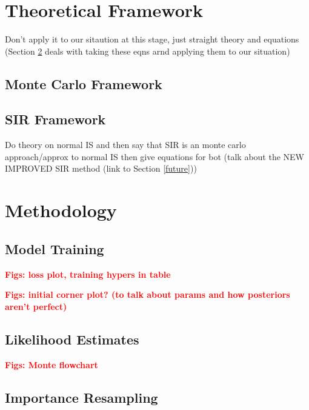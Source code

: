 \documentclass[prd,superscriptaddress,twocolumn,nopreprintnumbers,floatfix]{revtex4}
\begin{document}
\section{Theoretical Framework}\label{theory}

Don't apply it to our sitaution at this stage, just straight theory and equations (Section \ref{methods} deals with taking these eqns arnd applying them to our situation)

\subsection{Monte Carlo Framework}\label{theory:monte}

\subsection{SIR Framework}\label{theory:sir}

Do theory on normal IS and then say that SIR is an monte carlo approach/approx to normal IS then give equations for bot (talk about the NEW IMPROVED SIR method (link to Section \ref{future}))

%

\section{Methodology}\label{methods}





\subsection{Model Training}
\textbf{\textcolor{red}{Figs: loss plot, training hypers in table}}

\textbf{\textcolor{red}{Figs: initial corner plot? (to talk about params and how posteriors aren't perfect)}}


\subsection{Likelihood Estimates}

\textbf{\textcolor{red}{Figs: Monte flowchart}}

\subsection{Importance Resampling}
\end{document}
